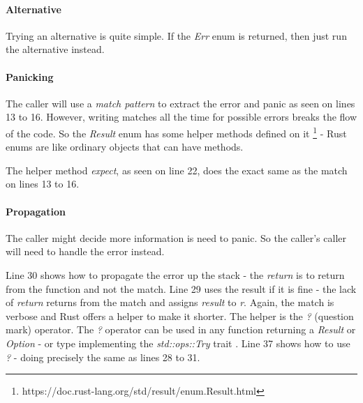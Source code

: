 \paragraph{Alternative}
Trying an alternative is quite simple.
If the \textit{Err} enum is returned, then just run the alternative instead.

\paragraph{Panicking}
The caller will use a \textit{match pattern} to extract the error and panic as seen on lines 13 to 16.
However, writing matches all the time for possible errors breaks the flow of the code.
So the \textit{Result} enum has some helper methods defined on it \footnote{https://doc.rust-lang.org/std/result/enum.Result.html} - Rust enums are like ordinary objects that can have methods.

The helper method \textit{expect}, as seen on line 22, does the exact same as the match on lines 13 to 16.

\paragraph{Propagation}
The caller might decide more information is need to panic.
So the caller's caller will need to handle the error instead.

Line 30 shows how to propagate the error up the stack - the \textit{return} is to return from the function and not the match.
Line 29 uses the result if it is fine - the lack of \textit{return} returns from the match and assigns \textit{result} to \textit{r}.
Again, the match is verbose and Rust offers a helper to make it shorter.
The helper is the \textit{?} (question mark) operator.
The \textit{?} operator can be used in any function returning a \textit{Result} or \textit{Option} - or type implementing the \textit{std::ops::Try} trait \cite{klabnik_2019_01}.
Line 37 shows how to use \textit{?} - doing precisely the same as lines 28 to 31.


